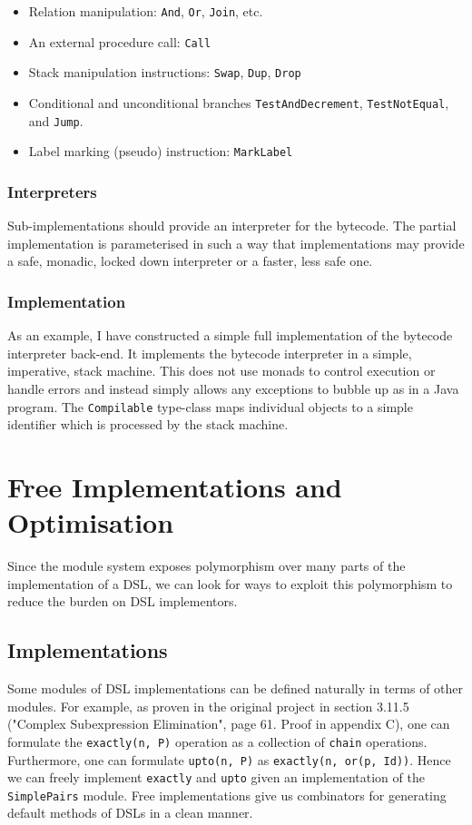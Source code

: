 \documentclass{report}
\newcommand \2[0]{\textbf{2}}
\newcommand \3[0]{\textbf{3}}
\begin{document}
\begin{itemize}
    \item Relation manipulation: \texttt{And}, \texttt{Or}, \texttt{Join}, etc.
    \item An external procedure call: \texttt{Call}
    \item Stack manipulation instructions: \texttt{Swap}, \texttt{Dup}, \texttt{Drop}
    \item Conditional and unconditional branches \texttt{TestAndDecrement}, \texttt{TestNotEqual}, and \texttt{Jump}.
    \item Label marking (pseudo) instruction: \texttt{MarkLabel}
\end{itemize}


\subsection{Interpreters}
Sub-implementations should provide an interpreter for the bytecode. The partial implementation is parameterised in such a way that implementations may provide a safe, monadic, locked down interpreter or a faster, less safe one.

\subsection{Implementation}
As an example, I have constructed a simple full implementation of the bytecode interpreter back-end. It implements the bytecode interpreter in a simple, imperative, stack machine. This does not use monads to control execution or handle errors and instead simply allows any exceptions to bubble up as in a Java program. The \texttt{Compilable} type-class maps individual objects to a simple identifier which is processed by the stack machine.

\chapter{Free Implementations and Optimisation}
Since the module system exposes polymorphism over many parts of the implementation of a DSL, we can look for ways to exploit this polymorphism to reduce the burden on DSL implementors.

\section{Implementations}
Some modules of DSL implementations can be defined naturally in terms of other modules. For example, as proven in the original project in section 3.11.5 ("Complex Subexpression Elimination", page 61. Proof in appendix C), one can formulate the \texttt{exactly(n, P)} operation as a collection of \texttt{chain} operations. Furthermore, one can formulate \texttt{upto(n, P)} as \texttt{exactly(n, or(p, Id))}. Hence we can freely implement \texttt{exactly} and \texttt{upto} given an implementation of the \texttt{SimplePairs} module. Free implementations give us combinators for generating default methods of DSLs in a clean manner.
\end{document}
